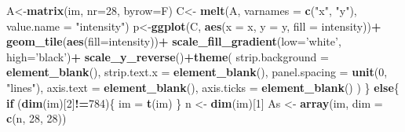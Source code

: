 \documentclass[]{book}
\newenvironment{Shaded}{\begin{snugshade}}{\end{snugshade}}
\newcommand{\ControlFlowTok}[1]{\textcolor[rgb]{0.13,0.29,0.53}{\textbf{#1}}}
\newcommand{\DataTypeTok}[1]{\textcolor[rgb]{0.13,0.29,0.53}{#1}}
\newcommand{\DecValTok}[1]{\textcolor[rgb]{0.00,0.00,0.81}{#1}}
\newcommand{\KeywordTok}[1]{\textcolor[rgb]{0.13,0.29,0.53}{\textbf{#1}}}
\newcommand{\NormalTok}[1]{#1}
\newcommand{\OperatorTok}[1]{\textcolor[rgb]{0.81,0.36,0.00}{\textbf{#1}}}
\newcommand{\StringTok}[1]{\textcolor[rgb]{0.31,0.60,0.02}{#1}}
\theoremstyle{definition}
\theoremstyle{definition}
\theoremstyle{definition}
\theoremstyle{remark}
\begin{document}
\begin{Shaded}
\begin{Highlighting}[]
\NormalTok{    A<-}\KeywordTok{matrix}\NormalTok{(im, }\DataTypeTok{nr=}\DecValTok{28}\NormalTok{, }\DataTypeTok{byrow=}\NormalTok{F)}
\NormalTok{    C<-}\StringTok{ }\KeywordTok{melt}\NormalTok{(A, }\DataTypeTok{varnames =} \KeywordTok{c}\NormalTok{(}\StringTok{"x"}\NormalTok{, }\StringTok{"y"}\NormalTok{), }\DataTypeTok{value.name =} \StringTok{"intensity"}\NormalTok{)}
\NormalTok{    p<-}\KeywordTok{ggplot}\NormalTok{(C, }\KeywordTok{aes}\NormalTok{(}\DataTypeTok{x =}\NormalTok{ x, }\DataTypeTok{y =}\NormalTok{ y, }\DataTypeTok{fill =}\NormalTok{ intensity))}\OperatorTok{+}
\StringTok{      }\KeywordTok{geom_tile}\NormalTok{(}\KeywordTok{aes}\NormalTok{(}\DataTypeTok{fill=}\NormalTok{intensity))}\OperatorTok{+}
\StringTok{      }\KeywordTok{scale_fill_gradient}\NormalTok{(}\DataTypeTok{low=}\StringTok{'white'}\NormalTok{, }\DataTypeTok{high=}\StringTok{'black'}\NormalTok{)}\OperatorTok{+}
\StringTok{      }\KeywordTok{scale_y_reverse}\NormalTok{()}\OperatorTok{+}\KeywordTok{theme}\NormalTok{(}
        \DataTypeTok{strip.background =} \KeywordTok{element_blank}\NormalTok{(),}
        \DataTypeTok{strip.text.x =} \KeywordTok{element_blank}\NormalTok{(),}
        \DataTypeTok{panel.spacing =} \KeywordTok{unit}\NormalTok{(}\DecValTok{0}\NormalTok{, }\StringTok{"lines"}\NormalTok{),}
        \DataTypeTok{axis.text =} \KeywordTok{element_blank}\NormalTok{(),}
        \DataTypeTok{axis.ticks =} \KeywordTok{element_blank}\NormalTok{()}
\NormalTok{      ) }
\NormalTok{  \}}
  \ControlFlowTok{else}\NormalTok{\{}
    \ControlFlowTok{if}\NormalTok{ (}\KeywordTok{dim}\NormalTok{(im)[}\DecValTok{2}\NormalTok{]}\OperatorTok{!=}\DecValTok{784}\NormalTok{)\{}
\NormalTok{      im =}\StringTok{ }\KeywordTok{t}\NormalTok{(im)}
\NormalTok{    \} }
\NormalTok{    n <-}\StringTok{ }\KeywordTok{dim}\NormalTok{(im)[}\DecValTok{1}\NormalTok{]}
\NormalTok{    As <-}\StringTok{ }\KeywordTok{array}\NormalTok{(im, }\DataTypeTok{dim =} \KeywordTok{c}\NormalTok{(n, }\DecValTok{28}\NormalTok{, }\DecValTok{28}\NormalTok{))}
    

\end{Highlighting}
\end{Shaded}
\end{document}
